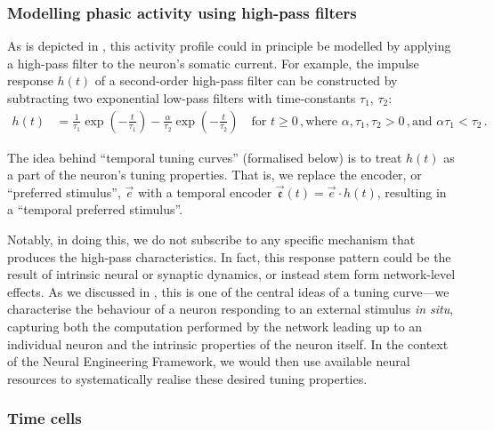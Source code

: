\subsubsection{Modelling phasic activity using high-pass filters}
As is depicted in , this activity profile could in principle be modelled by applying a high-pass filter to the neuron's somatic current.
For example, the impulse response $h(t)$ of a second-order high-pass filter can be constructed by subtracting two exponential low-pass filters with time-constants $\tau_1$, $\tau_2$:
\begin{align}
	h(t) &= \frac{1}{\tau_1} \exp\left( -\frac{t}{\tau_1} \right) - \frac{\alpha}{\tau_2} \exp\left( -\frac{t}{\tau_2} \right) \quad \text{for } t \geq 0 \,, \text{where } \alpha, \tau_1, \tau_2 > 0 \,, \text{and } \alpha \tau_1 < \tau_2 \,.
	\label{eqn:high_pass}
\end{align}

The idea behind \enquote{temporal tuning curves} (formalised below) is to treat $h(t)$ as a part of the neuron's tuning properties.
That is, we replace the encoder, or \enquote{preferred stimulus}, $\vec e$ with a temporal encoder $\vec{\mathfrak{e}}(t) = \vec{e} \cdot h(t)$, resulting in a \enquote{temporal preferred stimulus}.

Notably, in doing this, we do not subscribe to any specific mechanism that produces the high-pass characteristics.
In fact, this response pattern could be the result of intrinsic neural or synaptic dynamics, or instead stem form network-level effects.
As we discussed in , this is one of the central ideas of a tuning curve---we characterise the behaviour of a neuron responding to an external stimulus \emph{in situ}, capturing both the computation performed by the network leading up to an individual neuron and the intrinsic properties of the neuron itself.
In the context of the Neural Engineering Framework, we would then use available neural resources to systematically realise these desired tuning properties.

\subsubsection{Time cells}

